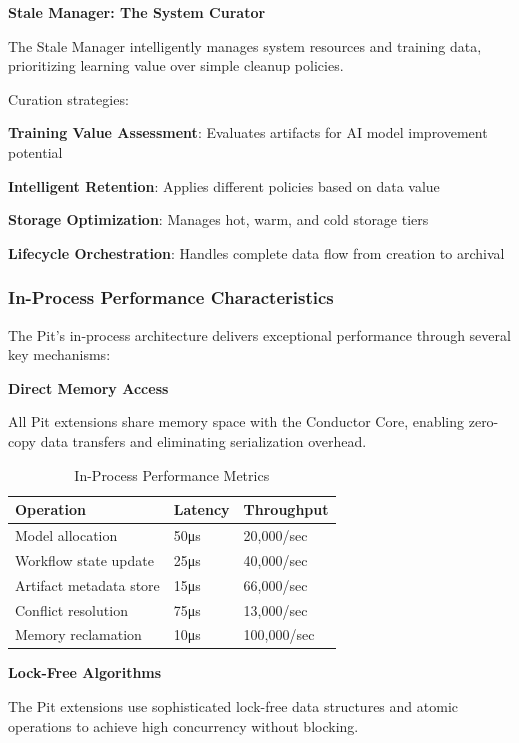 \textbf{Stale Manager: The System Curator}

The Stale Manager intelligently manages system resources and training data, prioritizing learning value over simple cleanup policies.

Curation strategies:
\begin{compactlist}
    \item \textbf{Training Value Assessment}: Evaluates artifacts for AI model improvement potential
    \item \textbf{Intelligent Retention}: Applies different policies based on data value
    \item \textbf{Storage Optimization}: Manages hot, warm, and cold storage tiers
    \item \textbf{Lifecycle Orchestration}: Handles complete data flow from creation to archival
\end{compactlist}

\subsubsection{In-Process Performance Characteristics}

The Pit's in-process architecture delivers exceptional performance through several key mechanisms:

\textbf{Direct Memory Access}

All Pit extensions share memory space with the Conductor Core, enabling zero-copy data transfers and eliminating serialization overhead.

\begin{table}[h]
\centering
\caption{In-Process Performance Metrics}
\label{tab:in-process-performance}
\begin{tabular}{@{}lll@{}}
\toprule
\textbf{Operation} & \textbf{Latency} & \textbf{Throughput} \\
\midrule
Model allocation & 50μs & 20,000/sec \\
Workflow state update & 25μs & 40,000/sec \\
Artifact metadata store & 15μs & 66,000/sec \\
Conflict resolution & 75μs & 13,000/sec \\
Memory reclamation & 10μs & 100,000/sec \\
\bottomrule
\end{tabular}
\end{table}

\textbf{Lock-Free Algorithms}

The Pit extensions use sophisticated lock-free data structures and atomic operations to achieve high concurrency without blocking.

